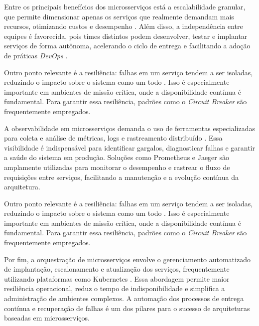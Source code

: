 Entre os principais benefícios dos microsserviços está a escalabilidade granular, que permite dimensionar apenas os serviços que realmente demandam mais recursos, otimizando custos e desempenho \cite{shekhar2023microservices}. Além disso, a independência entre equipes é favorecida, pois times distintos podem desenvolver, testar e implantar serviços de forma autônoma, acelerando o ciclo de entrega e facilitando a adoção de práticas \textit{DevOps} \cite{nizami2020comparison, farhan2023performance}.

Outro ponto relevante é a resiliência: falhas em um serviço tendem a ser isoladas, reduzindo o impacto sobre o sistema como um todo \cite{farhan2023performance}. Isso é especialmente importante em ambientes de missão crítica, onde a disponibilidade contínua é fundamental. Para garantir essa resiliência, padrões como o \textit{Circuit Breaker} são frequentemente empregados.

A observabilidade em microsserviços demanda o uso de ferramentas especializadas para coleta e análise de métricas, logs e rastreamento distribuído \cite{observability2023, sha2023automating}. Essa visibilidade é indispensável para identificar gargalos, diagnosticar falhas e garantir a saúde do sistema em produção. Soluções como Prometheus e Jaeger são amplamente utilizadas para monitorar o desempenho e rastrear o fluxo de requisições entre serviços, facilitando a manutenção e a evolução contínua da arquitetura.

Outro ponto relevante é a resiliência: falhas em um serviço tendem a ser isoladas, reduzindo o impacto sobre o sistema como um todo \cite{farhan2023performance}. Isso é especialmente importante em ambientes de missão crítica, onde a disponibilidade contínua é fundamental. Para garantir essa resiliência, padrões como o \textit{Circuit Breaker} são frequentemente empregados.

Por fim, a orquestração de microsserviços envolve o gerenciamento automatizado de implantação, escalonamento e atualização dos serviços, frequentemente utilizando plataformas como Kubernetes \cite{shekhar2023microservices}. Essa abordagem permite maior resiliência operacional, reduz o tempo de indisponibilidade e simplifica a administração de ambientes complexos. A automação dos processos de entrega contínua e recuperação de falhas é um dos pilares para o sucesso de arquiteturas baseadas em microsserviços.

